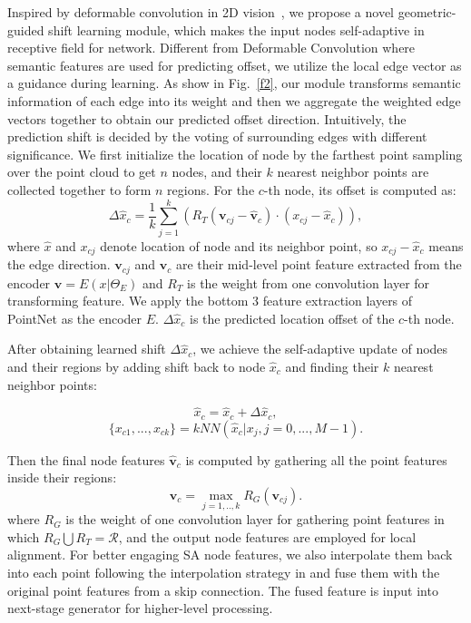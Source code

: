 \documentclass{article}
\begin{document}
Inspired by deformable convolution in 2D vision~\cite{dai2017deformable}, we propose a novel geometric-guided shift learning module, which makes the input nodes self-adaptive in receptive field for network. Different from Deformable Convolution where semantic features are used for predicting offset, we utilize the local edge vector as a guidance during learning. As show in Fig.~\ref{f2}, our module transforms semantic information of each edge into its weight and then we aggregate the weighted edge vectors together to obtain our predicted offset direction. Intuitively, the prediction shift is decided by the voting of surrounding edges with different significance. We first initialize the location of node by the farthest point sampling over the point cloud to get $n$ nodes, and their $k$ nearest neighbor points are collected together to form $n$ regions. For the $c$-th node, its offset is computed as:
\begin{equation}
\Delta{\hat{x}_c} =\frac{1}{k}\sum_{j=1}^{k}({R}_T(\mathbf{v}_{cj}-\hat{\mathbf{v}}_{c})\cdot(x_{cj}-\hat{x}_{c})),  \label{e1}
\end{equation}
where $\hat{x}$ and $x_{cj}$ denote location of node and its neighbor point, so $x_{cj} - \hat{x}_c$ means the edge direction. $\mathbf{v}_{cj}$ and $\hat{\mathbf{v}}_{c}$ are their mid-level point feature extracted from the encoder $\mathbf{v}=E(x|\Theta_E)$ and ${R}_T$ is the weight from one convolution layer for transforming feature. We apply the bottom 3 feature extraction layers of PointNet as the encoder $E$. $\Delta{\hat{x}_c}$ is the predicted location offset of the $c$-th node.

After obtaining learned shift $\Delta{\hat{x}_c}$, we achieve the self-adaptive update of nodes and their regions by adding shift back to node $\hat{x}_c$ and finding their $k$ nearest neighbor points:

\begin{equation}
    \hat{x}_c = \hat{x}_c + \Delta{\hat{x}_c},
\end{equation}
\begin{equation}
    \{x_{c1},...,x_{ck}\} = kNN(\hat{x}_c|x_j,j=0,...,M-1).
\end{equation}

Then the final node features $\hat{\mathbf{v}}_c$ is computed by gathering all the point features inside their regions:
\begin{equation}
\hat{\mathbf{v}}_c =\max\limits_{j=1,..,k} R_G(\mathbf{v}_{cj}).  \label{e2}
\end{equation}
where $R_G$ is the weight of one convolution layer for gathering point features in which ${R}_G \bigcup {R}_T = \mathcal{R}$, and the output node features are employed for local alignment. For better engaging SA node features, we also interpolate them back into each point following the interpolation strategy in \cite{qi2017pointnet++} and fuse them with the original point features from a skip connection. The fused feature is input into next-stage generator for higher-level processing.
\end{document}

